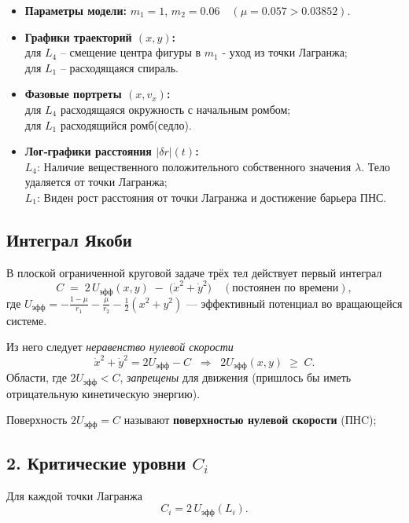 \documentclass[12pt]{article}
\begin{document}
\begin{itemize}
  \item \textbf{Параметры модели:} $m_1=1$, $m_2=0.06\quad(\mu=0.057>0.03852)$.
  \item \textbf{Графики траекторий $(x,y)$:}\\
        для $L_4$ -- смещение центра фигуры в $m_1$ - уход из точки Лагранжа;\\
        для $L_1$ -- расходящаяся спираль. 
  \item \textbf{Фазовые портреты $(x,v_x)$:}\\
        для $L_4$ расходящаяся окружность с начальным ромбом;\\
        для $L_1$ расходящийся ромб(седло).
  \item \textbf{Лог‑графики расстояния $|\delta r|(t)$:}\\
        $L_4$:  Наличие вещественного положительного собственного значения $\lambda$. Тело удаляется от точки Лагранжа;\\
        $L_1$: Виден рост расстояния от точки Лагранжа и достижение барьера ПНС.
\end{itemize}



\subsection{Интеграл Якоби}

В плоской ограниченной круговой задаче трёх тел действует первый интеграл
\[
C \;=\; 2\,U_{\mathrm{эфф}}(x,y)\;-\;\bigl(\dot x^{2}+\dot y^{2}\bigr)
\quad(\text{постоянен по времени}),
\]
где
\(
U_{\mathrm{эфф}} = -\frac{1-\mu}{r_1}-\frac{\mu}{r_2}-\tfrac12(x^{2}+y^{2})
\)
— эффективный потенциал во вращающейся системе.

Из него следует \emph{неравенство нулевой скорости}
\[
\dot x^{2}+\dot y^{2}=2U_{\mathrm{эфф}}-C \;\;\Longrightarrow\;\;
2U_{\mathrm{эфф}}(x,y)\;\ge\;C .
\]
Области, где $2U_{\mathrm{эфф}}<C$, \emph{запрещены} для движения
(пришлось бы иметь отрицательную кинетическую энергию).

Поверхность $2U_{\mathrm{эфф}}=C$ называют \textbf{поверхностью нулевой скорости} (ПНC);

\subsection{2. Критические уровни $C_i$}

Для каждой точки Лагранжа
\[
C_i = 2\,U_{\mathrm{эфф}}(L_i).
\]
\end{document}
